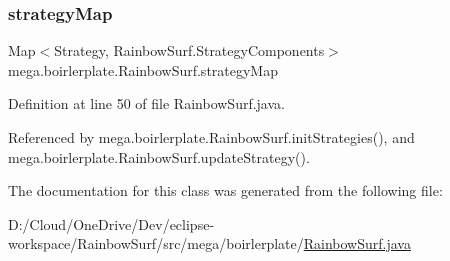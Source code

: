 \subsubsection{\texorpdfstring{strategy\+Map}{strategyMap}}
{\footnotesize\ttfamily Map$<$Strategy, Rainbow\+Surf.\+Strategy\+Components$>$ mega.\+boirlerplate.\+Rainbow\+Surf.\+strategy\+Map\hspace{0.3cm}{\ttfamily [private]}}



Definition at line 50 of file Rainbow\+Surf.\+java.



Referenced by mega.\+boirlerplate.\+Rainbow\+Surf.\+init\+Strategies(), and mega.\+boirlerplate.\+Rainbow\+Surf.\+update\+Strategy().



The documentation for this class was generated from the following file\+:\begin{DoxyCompactItemize}
\item 
D\+:/\+Cloud/\+One\+Drive/\+Dev/eclipse-\/workspace/\+Rainbow\+Surf/src/mega/boirlerplate/\hyperlink{_rainbow_surf_8java}{Rainbow\+Surf.\+java}\end{DoxyCompactItemize}
